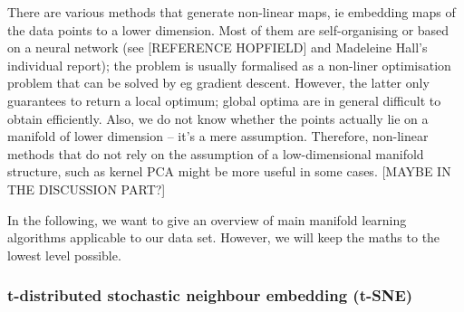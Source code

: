 \documentclass[journal, a4paper]{IEEEtran}
\begin{document}

There are various methods that generate non-linear maps, ie embedding maps of the data points to a lower dimension. Most of them are self-organising or based on a neural network (see [REFERENCE HOPFIELD] and Madeleine Hall's individual report); the problem is usually formalised as a non-liner optimisation problem that can be solved by eg gradient descent. However, the latter only guarantees to return a local optimum; global optima are in general difficult to obtain efficiently. Also, we do not know whether the points actually lie on a manifold of lower dimension -- it's a mere assumption.
Therefore, non-linear methods that do not rely on the assumption of a low-dimensional manifold structure, such as kernel PCA might be more useful in some cases. [MAYBE IN THE DISCUSSION PART?]

In the following, we want to give an overview of main manifold learning algorithms applicable to our data set. However, we will keep the maths to the lowest level possible.


\subsubsection{t-distributed stochastic neighbour embedding (t-SNE)}

\end{document}
